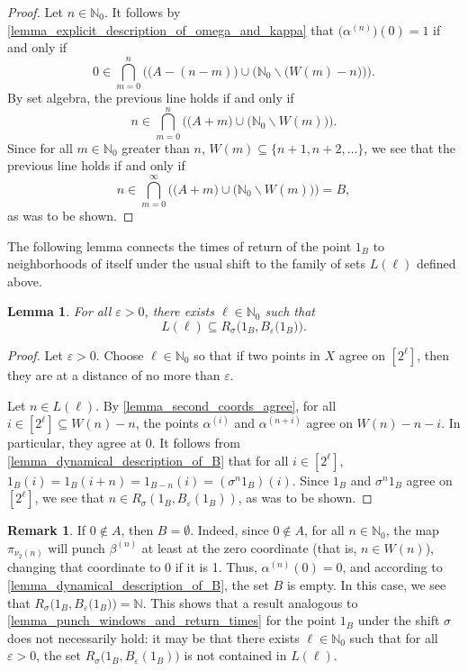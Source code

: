 \documentclass[letter,11pt]{article}
\theoremstyle{plain}
\newtheorem{lemma}[theorem]{Lemma}
\theoremstyle{definition}
\newtheorem{remark}[theorem]{Remark}
\theoremstyle{plain}
\theoremstyle{plain}
\numberwithin{equation}{section}
\newcommand{\eps}{\epsilon}
\newcommand{\N}{\mathbb{N}}
\renewcommand{\epsilon}{\varepsilon}
\renewcommand{\setminus}{\backslash}
\newcommand{\bpunch}{\beta}
\newcommand{\apunch}{\alpha}
\begin{document}
\begin{proof}
    Let $n \in \N_0$.  It follows by \cref{lemma_explicit_description_of_omega_and_kappa} that $\big(\apunch^{(n)}\big)(0) = 1$ if and only if
    \[0 \in \bigcap_{m=0}^{n} \Big( \big( A - (n-m) \big) \cup \big( \N_0 \setminus \big( W(m)-n \big) \big) \Big).\]
    By set algebra, the previous line holds if and only if
    \[n \in \bigcap_{m=0}^{n} \Big( \big( A +m \big) \cup \big( \N_0 \setminus W(m) \big) \Big).\]
    Since for all $m \in \N_0$ greater than $n$, $W(m) \subseteq \{n+1, n+2, \ldots \}$, we see that the previous line holds if and only if
    \[n \in \bigcap_{m=0}^{\infty} \Big( \big( A +m \big) \cup \big( \N_0 \setminus W(m) \big) \Big) = B,\]
    as was to be shown.
\end{proof}

The following lemma connects the times of return of the point $1_B$ to neighborhoods of itself under the usual shift to the family of sets $L(\ell)$ defined above.

\begin{lemma}
\label{lemma_punch_returns_vs_shift_returns}
    For all $\eps > 0$, there exists $\ell \in \N_0$ such that
    \[L(\ell) \subseteq R_\sigma\big(1_B, B_\eps\big(1_B \big) \big).\]
\end{lemma}

\begin{proof}
Let $\eps > 0$.  Choose $\ell \in \N_0$ so that if two points in $X$ agree on $[2^\ell]$, then they are at a distance of no more than $\eps$.  

Let $n \in L(\ell)$.  By \cref{lemma_second_coords_agree}, for all $i \in [2^\ell] \subseteq W(n) - n$, the points $\apunch^{(i)}$ and $\apunch^{(n+i)}$ agree on $W(n) - n - i$.  In particular, they agree at 0.  It follows from \cref{lemma_dynamical_description_of_B} that for all $i \in [2^\ell]$, $1_B(i) = 1_B(i+n) = 1_{B-n}(i) = (\sigma^{n} 1_B)(i)$.  Since $1_B$ and $\sigma^{n} 1_B$ agree on $[2^\ell]$, we see that $n \in R_\sigma(1_B,B_\eps(1_B))$, as was to be shown.
\end{proof}

\begin{remark}
    If $0 \not\in A$, then $B = \emptyset$.  Indeed, since $0 \not\in A$, for all $n \in \N_0$, the map $\pi_{\nu_2(n)}$ will punch $\bpunch^{(n)}$ at least at the zero coordinate (that is, $n \in W(n)$), changing that coordinate to 0 if it is 1.  Thus, $\apunch^{(n)}(0) = 0$, and according to \cref{lemma_dynamical_description_of_B}, the set $B$ is empty. In this case, we see that $R_\sigma\big(1_B, B_\eps\big(1_B \big) \big) = \N$.  This shows that a result analogous to \cref{lemma_punch_windows_and_return_times} for the point $1_B$ under the shift $\sigma$ does not necessarily hold: it may be that there exists $\ell \in \N_0$ such that for all $\eps > 0$, the set $R_\sigma\big(1_B, B_\eps(1_B ) \big)$ is not contained in $L(\ell)$.
\end{remark}
\end{document}
